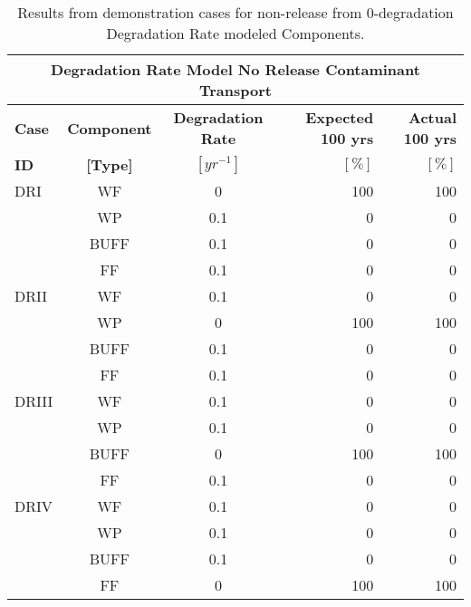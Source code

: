 \begin{table}[htp!]
\centering
\footnotesize{
\begin{tabularx}{\textwidth}{|X|c|c|r|r|}
  \multicolumn{5}{c}{\textbf{Degradation Rate Model No Release Contaminant Transport}}\\
  \hline
  \textbf{Case}  &  \textbf{Component} &  \textbf{Degradation Rate} & \textbf{Expected 100 yrs} & \textbf{Actual 100 yrs}\\
  \textbf{ID}    & \textbf{[Type]} &  \textbf{$[yr^{-1}]$}  &  $[\%]$  & $[\%]$\\
  \hline
  DRI     &  WF    &  0   & 100 & 100\\
          &  WP    &  0.1 & 0 & 0 \\
          &  BUFF  &  0.1 & 0 & 0 \\
          &  FF    &  0.1 & 0 & 0\\
  \hline
  DRII    &  WF    &  0.1 & 0 & 0\\
          &  WP    &  0   & 100 & 100\\
          &  BUFF  &  0.1 & 0 & 0\\
          &  FF    &  0.1 & 0 & 0\\
  \hline
  DRIII   &  WF    &  0.1 & 0 & 0\\
          &  WP    &  0.1 & 0 & 0\\
          &  BUFF  &  0   & 100 & 100\\
          &  FF    &  0.1 & 0 & 0\\
  \hline
  DRIV    &  WF    &  0.1 & 0 & 0\\
          &  WP    &  0.1 & 0 & 0\\
          &  BUFF  &  0.1 & 0 & 0\\
          &  FF    &  0   & 100 & 100\\
  \hline
\end{tabularx}
\caption[Degradation rate model no release problem results.]{Results from demonstration cases for non-release from 0-degradation Degradation Rate modeled Components.}
\label{tab:dr_base}
}
\end{table}
